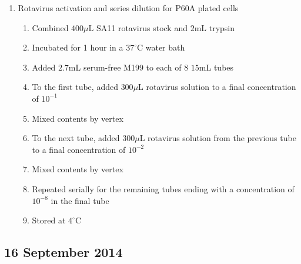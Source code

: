 \begin{enumerate}
	\item Rotavirus activation and series dilution for P60A plated cells
		\begin{enumerate}
			\item Combined $400\mu$L SA11 rotavirus stock and $2$mL trypsin
			\item Incubated for 1 hour in a $37^{\circ}$C water bath
			\item Added $2.7$mL serum-free M199 to each of 8 $15$mL tubes
			\item To the first tube, added $300\mu$L rotavirus solution to a final concentration of $10^{-1}$
			\item Mixed contents by vertex
			\item To the next tube, added $300\mu$L rotavirus solution from the previous tube to a final concentration of $10^{-2}$
			\item Mixed contents by vertex
			\item Repeated serially for the remaining tubes ending with a concentration of $10^{-8}$ in the final tube
			\item Stored at $4^{\circ}$C
		\end{enumerate}
\end{enumerate}

\subsection*{16 September 2014}

